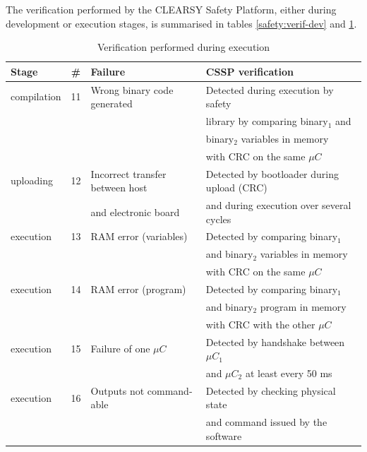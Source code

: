 The verification performed by the CLEARSY Safety Platform, either during development or execution stages, is summarised in tables \ref{safety:verif-dev} and \ref{safety:verif-exec}.
\begin{table}[ht]
\small
\begin{tabular}{|l|c|l|l|}
\hline
\textbf{Stage} & \textbf{\#} &  \textbf{Failure}                  & \textbf{CSSP verification} \\ \hline                
compilation    & 11 & Wrong binary code generated       & Detected during execution by safety \\
               &    &                                   & library by comparing binary$_1$ and  \\ 
               &    &                                   &  binary$_2$ variables in memory\\ 
               &    &                                   & with CRC on the same $\mu C$ \\ \hline
uploading      & 12 & Incorrect transfer between host   & Detected by bootloader during upload (CRC)\\
               &    & and electronic board              & and during execution over several cycles\\ \hline

execution      & 13 & RAM error (variables)             & Detected by comparing binary$_1$ \\
               &    &                                   & and binary$_2$ variables in memory \\
               &    &                                   & with CRC on the same $\mu C$ \\ \hline
execution      & 14 & RAM error (program)             & Detected by comparing binary$_1$ \\
               &    &                                   & and binary$_2$ program in memory \\
               &    &                                   & with CRC with the other $\mu C$ \\ \hline
execution      & 15 & Failure of one $\mu C$        & Detected by handshake between $\mu C_1$  \\ 
               &    &                               & and $\mu C_2$ at least every 50 ms \\ \hline
execution      & 16 & Outputs not command-able       & Detected by checking physical state  \\ 
               &    &                               & and command issued by the software \\
\hline
\end{tabular}
\caption{Verification performed during execution}
\label{safety:verif-exec}
\end{table}




